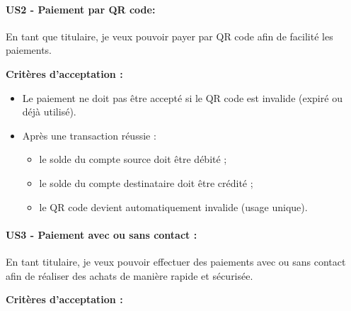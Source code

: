 \hypertarget{us2---paiement-par-qr-code}{%
\paragraph{US2 - Paiement par QR
code:}\label{us2---paiement-par-qr-code}}

En tant que titulaire, je veux pouvoir payer par QR code afin de
facilité les paiements.

\textbf{Critères d'acceptation :}

\begin{itemize}
\tightlist
\item
  Le paiement ne doit pas être accepté si le QR code est invalide
  (expiré ou déjà utilisé).
\item
  Après une transaction réussie :

  \begin{itemize}
  \tightlist
  \item
    le solde du compte source doit être débité ;
  \item
    le solde du compte destinataire doit être crédité ;
  \item
    le QR code devient automatiquement invalide (usage unique).
  \end{itemize}
\end{itemize}

\hypertarget{us3---paiement-avec-ou-sans-contact}{%
\paragraph{US3 - Paiement avec ou sans contact
:}\label{us3---paiement-avec-ou-sans-contact}}

En tant titulaire, je veux pouvoir effectuer des paiements avec ou sans
contact afin de réaliser des achats de manière rapide et sécurisée.

\textbf{Critères d'acceptation :}

